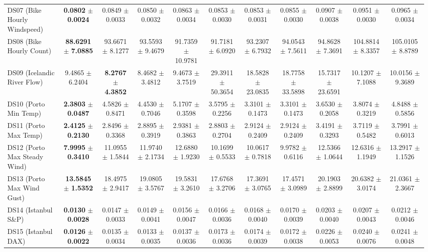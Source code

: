 \begin{table}[t]
{{\begin{tabular}{lcccccccccc}
DS07 (Bike Hourly Windspeed) & \textbf{0.0802} $\pm$ \textbf{0.0024} & 0.0849 $\pm$ 0.0033 & 0.0850 $\pm$ 0.0032 & 0.0863 $\pm$ 0.0034 & 0.0853 $\pm$ 0.0030 & 0.0853 $\pm$ 0.0031 & 0.0855 $\pm$ 0.0030 & 0.0907 $\pm$ 0.0038 & 0.0951 $\pm$ 0.0030 & 0.0965 $\pm$ 0.0034 \\
DS08 (Bike Hourly Count) & \textbf{88.6291} $\pm$ \textbf{7.0885} & 93.6671 $\pm$ 8.1277 & 93.5593 $\pm$ 9.4679 & 91.7359 $\pm$ 10.9781 & 91.7181 $\pm$ 6.0920 & 93.2307 $\pm$ 6.7932 & 94.0543 $\pm$ 7.5611 & 94.8628 $\pm$ 7.3691 & 104.8814 $\pm$ 8.3357 & 105.0105 $\pm$ 8.8789 \\
DS09 (Icelandic River Flow) & 9.4865 $\pm$ 6.2404 & \textbf{8.2767} $\pm$ \textbf{4.3852} & 8.4682 $\pm$ 3.4812 & 9.4673 $\pm$ 3.7519 & 29.3911 $\pm$ 50.3654 & 18.5828 $\pm$ 23.0835 & 18.7758 $\pm$ 33.5898 & 15.7317 $\pm$ 23.6591 & 10.1207 $\pm$ 7.1088 & 10.0156 $\pm$ 9.3689 \\
DS10 (Porto Min Temp) & \textbf{2.3803} $\pm$ \textbf{0.0487} & 4.5826 $\pm$ 0.8471 & 4.4530 $\pm$ 0.7046 & 5.1707 $\pm$ 0.3598 & 3.5795 $\pm$ 0.2256 & 3.3101 $\pm$ 0.1473 & 3.3101 $\pm$ 0.1473 & 3.6530 $\pm$ 0.2058 & 3.8074 $\pm$ 0.3219 & 4.8488 $\pm$ 0.5856 \\
DS11 (Porto Max Temp) & \textbf{2.4125} $\pm$ \textbf{0.2130} & 2.8496 $\pm$ 0.3368 & 2.8895 $\pm$ 0.3919 & 2.9381 $\pm$ 0.3863 & 2.8803 $\pm$ 0.2704 & 2.9124 $\pm$ 0.2409 & 2.9124 $\pm$ 0.2409 & 3.4191 $\pm$ 0.3293 & 3.7119 $\pm$ 0.5482 & 3.7991 $\pm$ 0.6013 \\
DS12 (Porto Max Steady Wind) & \textbf{7.9995} $\pm$ \textbf{0.3410} & 11.0955 $\pm$ 1.5844 & 11.9740 $\pm$ 2.1734 & 12.6880 $\pm$ 1.9230 & 10.1699 $\pm$ 0.5533 & 10.0617 $\pm$ 0.7818 & 9.9782 $\pm$ 0.6116 & 12.5366 $\pm$ 1.0644 & 12.6316 $\pm$ 1.1949 & 13.2917 $\pm$ 1.1526 \\
DS13 (Porto Max Wind Gust) & \textbf{13.5845} $\pm$ \textbf{1.5352} & 18.4975 $\pm$ 2.9417 & 19.0805 $\pm$ 3.5767 & 19.5831 $\pm$ 3.2610 & 17.6768 $\pm$ 3.2706 & 17.3691 $\pm$ 3.0765 & 17.4571 $\pm$ 3.0989 & 20.1903 $\pm$ 2.8899 & 20.6382 $\pm$ 3.0174 & 21.0361 $\pm$ 2.3667 \\
DS14 (Istanbul S\&P) & \textbf{0.0130} $\pm$ \textbf{0.0028} & 0.0147 $\pm$ 0.0033 & 0.0149 $\pm$ 0.0041 & 0.0156 $\pm$ 0.0047 & 0.0166 $\pm$ 0.0036 & 0.0168 $\pm$ 0.0040 & 0.0170 $\pm$ 0.0039 & 0.0203 $\pm$ 0.0040 & 0.0207 $\pm$ 0.0043 & 0.0212 $\pm$ 0.0046 \\
DS15 (Istanbul DAX) & \textbf{0.0126} $\pm$ \textbf{0.0022} & 0.0135 $\pm$ 0.0034 & 0.0133 $\pm$ 0.0035 & 0.0137 $\pm$ 0.0036 & 0.0173 $\pm$ 0.0036 & 0.0174 $\pm$ 0.0039 & 0.0172 $\pm$ 0.0038 & 0.0226 $\pm$ 0.0053 & 0.0240 $\pm$ 0.0076 & 0.0241 $\pm$ 0.0048 \\

\end{tabular}}}
\end{table}
